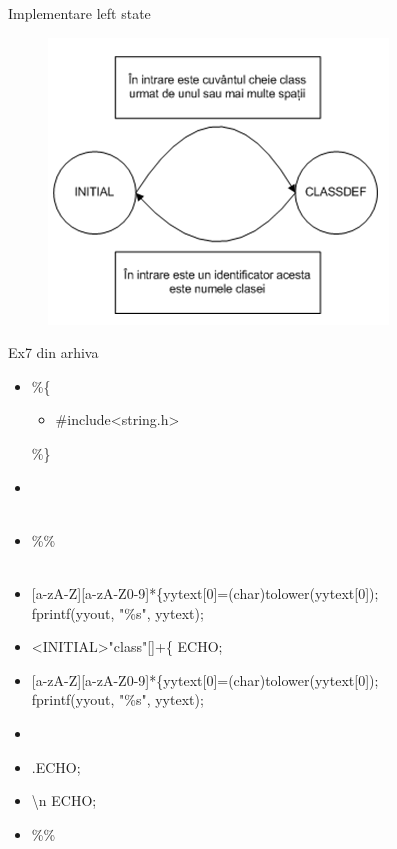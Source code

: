 \documentclass[pdf]{beamer}
\begin{document}
\begin{frame}{Implementare left state}
\begin{figure}
\includegraphics[scale=0.8]{compil3.PNG}
\end{figure}

\end{frame}



\begin{frame}{Ex7 din arhiva}
\begin{itemize}
\item[]
\%\{
\begin{itemize}
    \item[]
    \#include<string.h>
\end{itemize}
\%\}
\item[]
\color{red}{\%s CLASSDEF} \\~\\
\item[]
\color{black} {\%\%} \\~\\

\item[]
\color{red}{<INITIAL>} \color{black} [a-zA-Z][a-zA-Z0-9]*\{yytext[0]=(char)tolower(yytext[0]);\\
fprintf(yyout, "\%s", yytext); \color{black}{\}}

\item[]
\textless INITIAL>"class"[]+\{ ECHO; \color{red}{BEGIN CLASSDEF;} \color{black}{\}}

\item[]
\color{red}{<CLASSDEF>} \color{black} [a-zA-Z][a-zA-Z0-9]*\{yytext[0]=(char)tolower(yytext[0]);\\
fprintf(yyout, "\%s", yytext); \color{red}{BEGIN INITIAL;}
\item[]
\color{black}{\}}
\item[]
.ECHO;
\item[]
\textbackslash n ECHO;
\item[]
\%\%
\end{itemize}
\end{frame}
\end{document}
